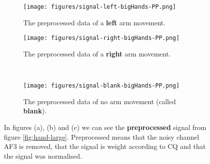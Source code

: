 \begin{figure}[p]
    \centering
    \begin{subfigure}{0.42\linewidth}
        \centering
        \captionsetup{width = 0.9\linewidth}
        \texttt{[image: figures/signal-left-bigHands-PP.png]}
        \caption{The preprocessed data of a \textbf{left} arm movement.}
        \label{fig:hand-large-left-PP}
    \end{subfigure}%
    \begin{subfigure}{0.42\linewidth}
        \centering
        \captionsetup{width = 0.9\linewidth}
        \texttt{[image: figures/signal-right-bigHands-PP.png]}
        \caption{The preprocessed data of a \textbf{right} arm movement.}
        \label{fig:hand-large-right-PP}
    \end{subfigure}%
    \\
    \begin{subfigure}{0.42\linewidth}
        \centering
        \captionsetup{width = 0.9\linewidth}
        \texttt{[image: figures/signal-blank-bigHands-PP.png]}
        \caption{The preprocessed data of no arm movement (called \textbf{blank}).}
        \label{fig:hand-large-blank-PP}
    \end{subfigure}%
    \begin{minipage}{0.42 \linewidth}
        \vspace{\baselineskip}
        \caption{In figures (a), (b) and (c) we can see the \textbf{preprocessed} signal from figure \ref{fig:hand-large}. Preprocessed means that the noisy channel \textsc{AF3} is removed, that the signal is weight according to CQ and that the signal was normalised.}
        \label{fig:hand-large-PP}
    \end{minipage}
\end{figure}